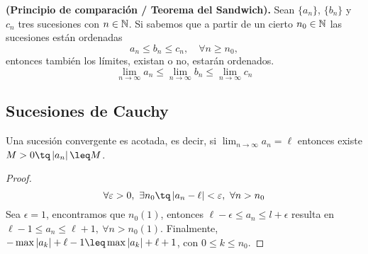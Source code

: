 
\begin{theorem}
    \textbf{(Principio de comparación / Teorema del Sandwich).} Sean $\{a_n\} $, $\{b_n\} $ y $c_n$ tres sucesiones con $n\in\mathbb{N}$. Si sabemos que a partir de un cierto $n_0\in\mathbb{N}$ las sucesiones están ordenadas
    \begin{equation}
        a_n\leq b_n\leq c_n,\quad\forall n\geq n_0,
    \end{equation}
    entonces también los límites, existan o no, estarán ordenados.
    \begin{equation}
        \lim_{n\to\infty}a_n \leq \lim_{n\to\infty} b_n \leq \lim_{n\to\infty} c_n
    \end{equation}
\end{theorem}

\subsection{Sucesiones de Cauchy}
\begin{lemma}
    Una sucesión convergente es acotada, es decir, si $\lim_{n\to\infty} a_n = \ell$ entonces existe $M > 0 \tq \abs{a_n} \leq M$.
\end{lemma}

\begin{proof}
    \begin{equation}
        \forall\epsilon > 0,\ \exists n_0\tq \abs{a_n - \ell} < \epsilon,\ \forall n > n_0
    \end{equation}
    Sea $\epsilon = 1$, encontramos que $n_0\left( 1 \right)$, entonces $\ell - \epsilon \leq a_n\leq l + \epsilon$ resulta en $\ell - 1 \leq a_n \leq \ell + 1,\ \forall n > n_0\left( 1 \right) $. Finalmente, $-\max\abs{a_k}+ \ell - 1\leq \max\abs{a_k} + \ell + 1$, con $0\leq k\leq n_0$.
\end{proof}

